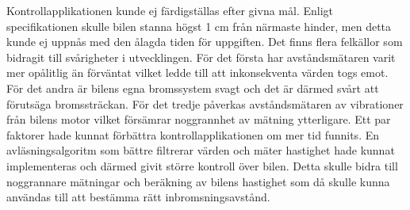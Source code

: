 \documentclass[a4paper]{article}
\begin{document}
\vspace{5mm} 
\noindent
Kontrollapplikationen kunde ej färdigställas efter givna mål. Enligt specifikationen skulle bilen stanna högst 1 cm från närmaste hinder, men detta kunde ej uppnås med den ålagda tiden för uppgiften. Det finns flera felkällor som bidragit till svårigheter i utvecklingen. För det första har avståndsmätaren varit mer opålitlig än förväntat vilket ledde till att inkonsekventa värden togs emot. För det andra är bilens egna bromssystem svagt och det är därmed svårt att förutsäga bromssträckan. För det tredje påverkas avståndsmätaren av vibrationer från bilens motor vilket försämrar noggrannhet av mätning ytterligare. Ett par faktorer hade kunnat förbättra kontrollapplikationen om mer tid funnits. En avläsningsalgoritm som bättre filtrerar värden och mäter hastighet hade kunnat implementeras och därmed givit större kontroll över bilen. Detta skulle bidra till noggrannare mätningar och beräkning av bilens hastighet som då skulle kunna användas till att bestämma rätt inbromsningsavstånd.








\end{document}
